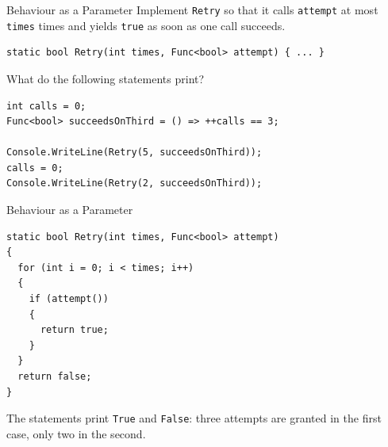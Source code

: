 \begin{exerciseframe}{Behaviour as a Parameter}
  Implement \texttt{Retry} so that it calls \texttt{attempt} at most
  \texttt{times} times and yields \texttt{true} as soon as one call succeeds.
  \vspace{1ex}

  \begin{lstlisting}[basicstyle=\scriptsize\ttfamily]
static bool Retry(int times, Func<bool> attempt) { ... }
  \end{lstlisting}

  What do the following statements print?
  \vspace{1ex}

\begin{lstlisting}[basicstyle=\scriptsize\ttfamily]
int calls = 0;
Func<bool> succeedsOnThird = () => ++calls == 3;

Console.WriteLine(Retry(5, succeedsOnThird));
calls = 0;
Console.WriteLine(Retry(2, succeedsOnThird));
  \end{lstlisting}
\end{exerciseframe}

\begin{solutionframe}{Behaviour as a Parameter}
  \begin{lstlisting}[basicstyle=\scriptsize\ttfamily]
static bool Retry(int times, Func<bool> attempt)
{
  for (int i = 0; i < times; i++)
  {
    if (attempt())
    {
      return true;
    }
  }
  return false;
}
  \end{lstlisting}
  The statements print \texttt{True} and \texttt{False}: three attempts are
  granted in the first case, only two in the second.
  \vspace{3ex}

\end{solutionframe}

